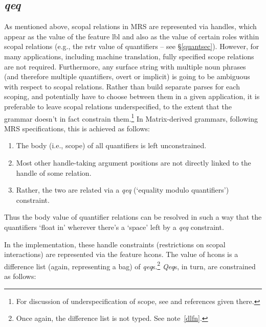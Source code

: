 \documentclass[12pt]{article}
\newcommand{\es}{\enumsentence}
\newcommand{\fn}{\footnote}
\begin{document}
\subsection{{\it qeq}}
\label{qeqsec}

As mentioned above, scopal relations in MRS are represented via
handles, which appear as the value of the feature {\sc lbl} and also
as the value of certain roles within scopal relations (e.g., the {\sc
rstr} value of quantifiers -- see \S\ref{quantsec}).
However, for many applications, including machine translation, fully
specified scope relations are not required.  Furthermore, any surface
string with multiple noun phrases (and therefore multiple quantifiers,
overt or implicit) is going to be ambiguous with respect to scopal
relations.  Rather than build separate parses for each scoping, and
potentially have to choose between them in a given application, it is
preferable to leave scopal relations underspecified, to the extent
that the grammar doesn't in fact constrain them.\fn{For discussion of
underspecification of scope, see  and
references given there.}  In Matrix-derived grammars, following MRS 
specifications, this is achieved as follows:

\begin{enumerate}
\item The {\sc body} (i.e., scope) of all quantifiers is left unconstrained.
\item Most other handle-taking argument positions are not directly linked 
to the handle of some relation.
\item Rather, the two are related via a {\it qeq} (`equality modulo 
quantifiers') constraint.
\end{enumerate}

\noindent
Thus the {\sc body} value of quantifier relations can be resolved in
such a way that the quantifiers `float in' wherever there's a `space'
left by a {\it qeq} constraint.

In the implementation, these handle constraints (restrictions on scopal
interactions) are represented via the feature {\sc
hcons}.  The value of {\sc hcons} is a difference list (again,
representing a bag) of {\it qeq}s.\fn{Once again, the difference list
is not typed.  See note~\ref{dlfn}.}  {\it Qeq}s, in turn, are
constrained as follows:

\es{
\begin{avm}
{\it qeq}: \[ harg & handle\\
	      larg & handle \]
\end{avm}
}
\end{document}

